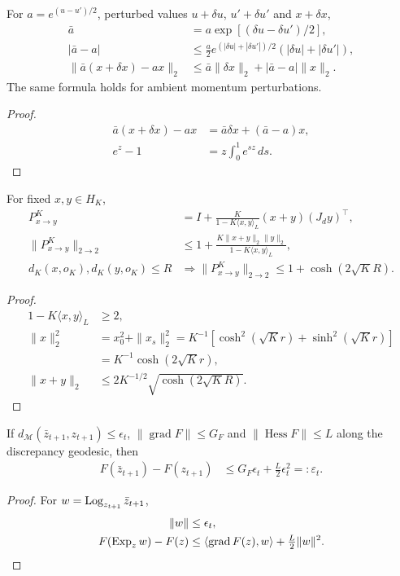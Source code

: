 \begin{proposition}
For $a=e^{(u-u')/2}$, perturbed values $u+\delta u$, $u'+\delta u'$ and $x+\delta x$,
\begin{align}
 \bar a&=a\exp[(\delta u-\delta u')/2],\\
 |\bar a-a|&\le\tfrac a2e^{(|\delta u|+|\delta u'|)/2}
 (|\delta u|+|\delta u'|),\\
 \|\bar a(x+\delta x)-ax\|_2
 &\le\bar a\|\delta x\|_2+|\bar a-a|\|x\|_2.
\end{align}
The same formula holds for ambient momentum perturbations.
\end{proposition}
\begin{proof}
\begin{align}
 \bar a(x+\delta x)-ax&=\bar a\delta x+(\bar a-a)x,\\
 e^z-1&=z\int_0^1e^{sz}\,ds.
\end{align}
\end{proof}

\begin{proposition}
For fixed $x,y\in H_K$,
\begin{align}
 P_{x\to y}^K&=I+\frac K{1-K\langle x,y\rangle_L}(x+y)(J_dy)^\top,\\
 \|P_{x\to y}^K\|_{2\to2}
 &\le1+\frac{K\|x+y\|_2\|y\|_2}{1-K\langle x,y\rangle_L},\\
 d_K(x,o_K),d_K(y,o_K)\le R
 &\Longrightarrow
 \|P_{x\to y}^K\|_{2\to2}\le1+\cosh(2\sqrt KR).
\end{align}
\end{proposition}
\begin{proof}
\begin{align}
 1-K\langle x,y\rangle_L&\ge2,\\
 \|x\|_2^2&=x_0^2+\|x_s\|_2^2
 =K^{-1}[\cosh^2(\sqrt Kr)+\sinh^2(\sqrt Kr)]\\
 &=K^{-1}\cosh(2\sqrt Kr),\\
 \|x+y\|_2&\le2K^{-1/2}\sqrt{\cosh(2\sqrt KR)}.
\end{align}
\end{proof}

\begin{lemma}
If $d_{\mathcal M}(\bar z_{t+1},z_{t+1})\le\epsilon_t$,
$\|\operatorname{grad}F\|\le G_F$ and $\|\operatorname{Hess}F\|\le L$ along the discrepancy geodesic, then
\begin{align}\label{eq:objective-roundoff}
 F(\bar z_{t+1})-F(z_{t+1})
 &\le G_F\epsilon_t+\tfrac L2\epsilon_t^2=:\varepsilon_t.
\end{align}
\end{lemma}
\begin{proof}
For $w=\operatorname{Log}_{z_{t+1}}\bar z_{t+1}$,
\begin{align}
 \|w\|&\le\epsilon_t,\\
 F(\operatorname{Exp}_zw)-F(z)&\le\langle\operatorname{grad}F(z),w\rangle+\tfrac L2\|w\|^2.
\end{align}
\end{proof}

